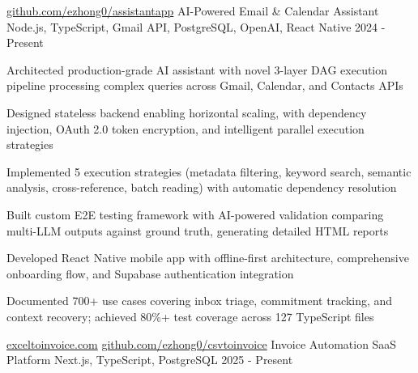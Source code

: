 \documentclass[12pt, letterpaper]{russell}
\begin{document}
\vspace{-0.2cm}
\begin{cventries}
\cvprojectinline
    {\href{https://github.com/ezhong0/assistantapp}{github.com/ezhong0/assistantapp}} %
    {AI-Powered Email \& Calendar Assistant} %
    {Node.js, TypeScript, Gmail API, PostgreSQL, OpenAI, React Native} %
    {2024 - Present} %
    {
      \begin{cvitems}
        \item {Architected production-grade AI assistant with novel 3-layer DAG execution pipeline processing complex queries across Gmail, Calendar, and Contacts APIs}
        \item {Designed stateless backend enabling horizontal scaling, with dependency injection, OAuth 2.0 token encryption, and intelligent parallel execution strategies}
        \item {Implemented 5 execution strategies (metadata filtering, keyword search, semantic analysis, cross-reference, batch reading) with automatic dependency resolution}
        \item {Built custom E2E testing framework with AI-powered validation comparing multi-LLM outputs against ground truth, generating detailed HTML reports}
        \item {Developed React Native mobile app with offline-first architecture, comprehensive onboarding flow, and Supabase authentication integration}
        \item {Documented 700+ use cases covering inbox triage, commitment tracking, and context recovery; achieved 80\%+ test coverage across 127 TypeScript files}
      \end{cvitems}
    }
\cvprojectinline
    {\href{exceltoinvoice.com}{exceltoinvoice.com} \textbar{} \href{https://github.com/ezhong0/csvtoinvoice}{github.com/ezhong0/csvtoinvoice}} %
    {Invoice Automation SaaS Platform} %
    {Next.js, TypeScript, PostgreSQL} %
    {2025 - Present} %
    {
      \begin{cvitems}

\end{cvitems}}
\end{cventries}
\end{document}
